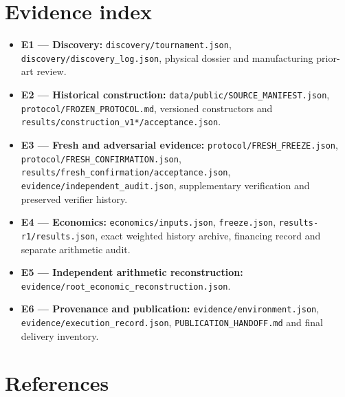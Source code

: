 \documentclass[11pt,letterpaper]{article}
\providecommand{\tightlist}{\setlength{\itemsep}{2pt}\setlength{\parskip}{0pt}}
\begin{document}
\hypertarget{evidence-index}{%
\section{Evidence index}\label{evidence-index}}

\begin{itemize}
\tightlist
\item
  \textbf{E1 --- Discovery:} \nolinkurl{discovery/tournament.json}, \nolinkurl{discovery/discovery_log.json}, physical dossier and manufacturing prior-art review.
\item
  \textbf{E2 --- Historical construction:} \nolinkurl{data/public/SOURCE_MANIFEST.json}, \nolinkurl{protocol/FROZEN_PROTOCOL.md}, versioned constructors and \nolinkurl{results/construction_v1*/acceptance.json}.
\item
  \textbf{E3 --- Fresh and adversarial evidence:} \nolinkurl{protocol/FRESH_FREEZE.json}, \nolinkurl{protocol/FRESH_CONFIRMATION.json}, \nolinkurl{results/fresh_confirmation/acceptance.json}, \nolinkurl{evidence/independent_audit.json}, supplementary verification and preserved verifier history.
\item
  \textbf{E4 --- Economics:} \nolinkurl{economics/inputs.json}, \nolinkurl{freeze.json}, \nolinkurl{results-r1/results.json}, exact weighted history archive, financing record and separate arithmetic audit.
\item
  \textbf{E5 --- Independent arithmetic reconstruction:} \nolinkurl{evidence/root_economic_reconstruction.json}.
\item
  \textbf{E6 --- Provenance and publication:} \nolinkurl{evidence/environment.json}, \nolinkurl{evidence/execution_record.json}, \nolinkurl{PUBLICATION_HANDOFF.md} and final delivery inventory.
\end{itemize}

\hypertarget{references}{%
\section{References}\label{references}}
\end{document}
